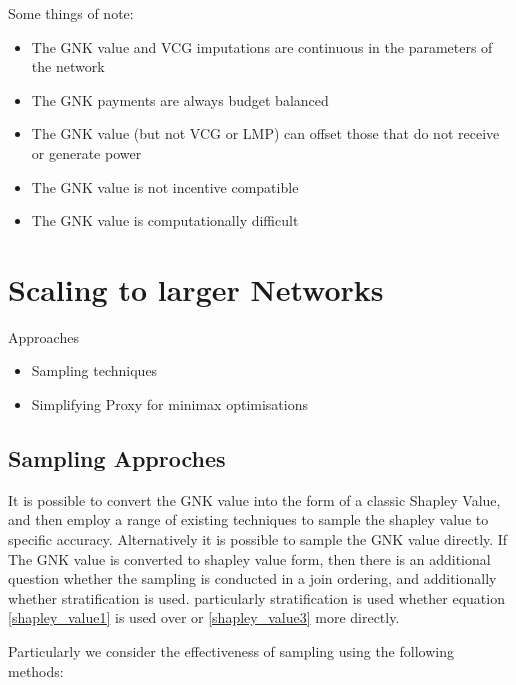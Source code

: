 \documentclass[
10pt, %
a4paper, %
oneside, %
headinclude,footinclude, %
BCOR5mm, %
]{scrartcl}
\begin{document}
Some things of note:

\begin{itemize}
\item	The GNK value and VCG imputations are continuous in the parameters of the network
\item	The GNK payments are always budget balanced
\item	The GNK value (but not VCG or LMP) can offset those that do not receive or generate power
\item	The GNK value is not incentive compatible
\item	The GNK value is computationally difficult
\end{itemize}

\section{Scaling to larger Networks}

Approaches
\begin{itemize}
\item	Sampling techniques
\item	Simplifying Proxy for minimax optimisations
\end{itemize}

\subsection{Sampling Approches}
It is possible to convert the GNK value into the form of a classic Shapley Value, and then employ a range of existing techniques to sample the shapley value to specific accuracy.
Alternatively it is possible to sample the GNK value directly.
If The GNK value is converted to shapley value form, then there is an additional question whether the sampling is conducted in a join ordering, and additionally whether stratification is used.
particularly stratification is used whether equation \ref{shapley_value1} is used over or \ref{shapley_value3} more directly.

Particularly we consider the effectiveness of sampling using the following methods:
\end{document}
